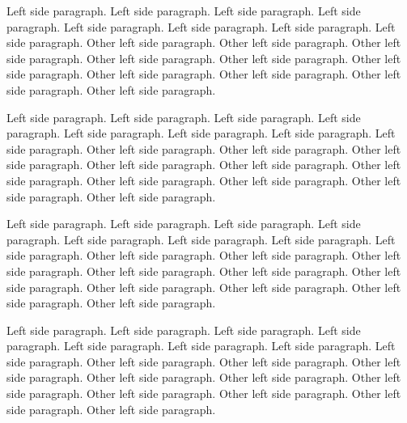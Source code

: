 \documentclass[a5paper,11pt]{article}
\begin{document}
\begin{pages}
\begin{Leftside}
            \pend
        \endnumbering
    \end{Leftside}
    \begin{Rightside}
        \beginnumbering
            \pstart
                Left side paragraph. Left side paragraph. Left side paragraph. Left side paragraph. Left side paragraph. Left side paragraph. Left side paragraph. Left side paragraph.
            \pend
            \pstart
                Other left side paragraph.  Other left side paragraph.  Other left side paragraph.  Other left side paragraph.  Other left side paragraph.  Other left side paragraph.  Other left side paragraph.  Other left side paragraph.  Other left side paragraph.  Other left side paragraph.
            \pend

                        \pstart
                Left side paragraph. Left side paragraph. Left side paragraph. Left side paragraph. Left side paragraph. Left side paragraph. Left side paragraph. Left side paragraph.
            \pend
            \pstart
                Other left side paragraph.  Other left side paragraph.  Other left side paragraph.  Other left side paragraph.  Other left side paragraph.  Other left side paragraph.  Other left side paragraph.  Other left side paragraph.  Other left side paragraph.  Other left side paragraph.
            \pend

                        \pstart
                Left side paragraph. Left side paragraph. Left side paragraph. Left side paragraph. Left side paragraph. Left side paragraph. Left side paragraph. Left side paragraph.
            \pend
            \pstart
                Other left side paragraph.  Other left side paragraph.  Other left side paragraph.  Other left side paragraph.  Other left side paragraph.  Other left side paragraph.  Other left side paragraph.  Other left side paragraph.  Other left side paragraph.  Other left side paragraph.
            \pend

                        \pstart
                Left side paragraph. Left side paragraph. Left side paragraph. Left side paragraph. Left side paragraph. Left side paragraph. Left side paragraph. Left side paragraph.
            \pend
            \pstart
                Other left side paragraph.  Other left side paragraph.  Other left side paragraph.  Other left side paragraph.  Other left side paragraph.  Other left side paragraph.  Other left side paragraph.  Other left side paragraph.  Other left side paragraph.  Other left side paragraph.
            \pend


\end{Rightside}
\end{pages}
\end{document}
